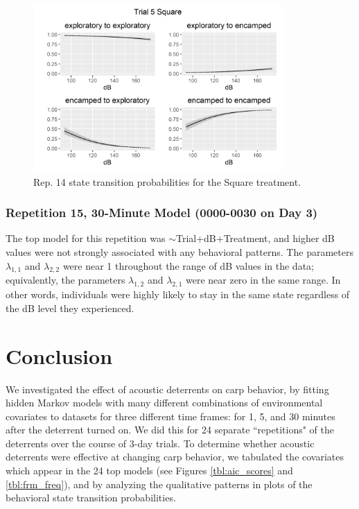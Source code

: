 \documentclass[12pt]{article}
\begin{document}
	\begin{figure}
		\centering
		\includegraphics[width=0.85\textwidth]{trans_rep_14_trial_5_Square.png}
		\caption{Rep. 14 state transition probabilities for the Square treatment.}
		\label{img:rep5_30min_trans_tmnt}
	\end{figure}
	
	\subsubsection{Repetition 15, 30-Minute Model (0000-0030 on Day 3)}
	
	The top model for this repetition was $\sim$Trial+dB+Treatment, and higher dB values were not strongly associated with any behavioral patterns. The parameters $\lambda_{1, 1}$ and $\lambda_{2, 2}$ were near 1 throughout the range of dB values in the data; equivalently, the parameters $\lambda_{1, 2}$ and $\lambda_{2, 1}$ were near zero in the same range. In other words, individuals were highly likely to stay in the same state regardless of the dB level they experienced.
	
	\section{Conclusion}
	
	We investigated the effect of acoustic deterrents on carp behavior, by fitting hidden Markov models with many different combinations of environmental covariates to datasets for three different time frames: for 1, 5, and 30 minutes after the deterrent turned on. We did this for 24 separate ``repetitions" of the deterrents over the course of 3-day trials. To determine whether acoustic deterrents were effective at changing carp behavior, we tabulated the covariates which appear in the 24 top models (see Figures \ref{tbl:aic_scores} and \ref{tbl:frm_freq}), and by analyzing the qualitative patterns in plots of the behavioral state transition probabilities.
	
\end{document}
